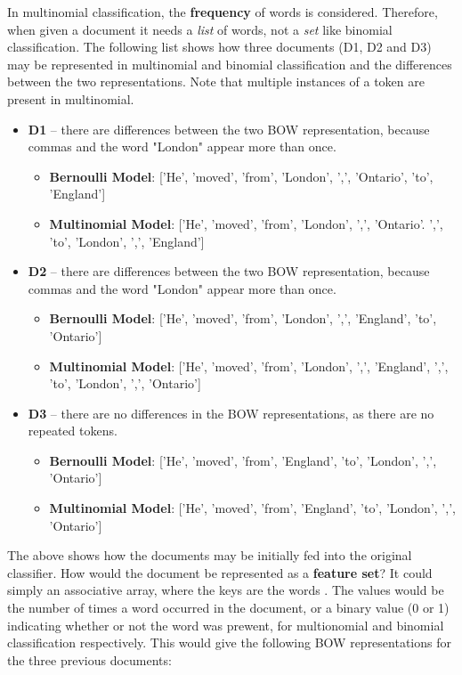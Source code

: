 \documentclass{article}
\begin{document}
In multinomial classification, the \textbf{frequency} of words is considered. Therefore, when given a document it needs a \textit{list} of words, not a \textit{set} like binomial classification. The following list shows how three documents (D1, D2 and D3) may be represented in multinomial and binomial classification and the differences between the two representations. Note that multiple instances of a token are present in multinomial.
\begin{itemize}
	\item \textbf{D1} -- there are differences between the two BOW representation, because commas and the word "London" appear more than once. \begin{itemize}
		\item \textbf{Bernoulli Model}: ['He', 'moved', 'from', 'London', ',', 'Ontario', 'to', 'England']
		\item \textbf{Multinomial Model}: ['He', 'moved', 'from', 'London', ',', 'Ontario'. ',', 'to', 'London', ',', 'England']
		\end{itemize}
	\item \textbf{D2} -- there are differences between the two BOW representation, because commas and the word "London" appear more than once. \begin{itemize}
		\item \textbf{Bernoulli Model}: ['He', 'moved', 'from', 'London', ',', 'England', 'to', 'Ontario']
		\item \textbf{Multinomial Model}: ['He', 'moved', 'from', 'London', ',', 'England', ',', 'to', 'London', ',', 'Ontario']
	  \end{itemize}
	\item \textbf{D3} -- there are no differences in the BOW representations, as there are no repeated tokens.
	\begin{itemize}
	\item \textbf{Bernoulli Model}: ['He', 'moved', 'from', 'England', 'to', 'London', ',', 'Ontario']
	\item \textbf{Multinomial Model}: ['He', 'moved', 'from', 'England', 'to', 'London', ',', 'Ontario']
	\end{itemize}
\end{itemize}

The above shows how the documents may be initially fed into the original classifier. How would the document be represented as a \textbf{feature set}? It could simply an associative array, where the keys are the words . The values would be the number of times a word occurred in the document, or a binary value (0 or 1) indicating whether or not the word was prewent, for multionomial and binomial classification respectively. This would give the following BOW representations for the three previous documents:
\end{document}
